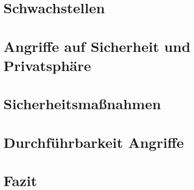 \documentclass{beamer}
\begin{document}
\section{Schwachstellen}
\begin{frame}
\frametitle{}

\end{frame}

\section{Angriffe auf Sicherheit und Privatsphäre}
\begin{frame}
\frametitle{}

\end{frame}

\section{Sicherheitsmaßnahmen}
\begin{frame}
\frametitle{}

\end{frame}

\section{Durchführbarkeit Angriffe}
\begin{frame}
\frametitle{}

\end{frame}

\section{Fazit}
\begin{frame}
\frametitle{}

\end{frame}
\end{document}
